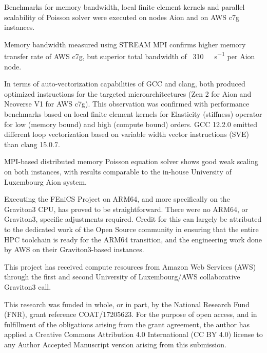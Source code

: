 Benchmarks for memory bandwidth, local finite element kernels and parallel
scalability of Poisson solver were executed on nodes Aion and on AWS c7g
instances.

Memory bandwidth measured using STREAM MPI confirms higher memory transfer rate
of AWS c7g, but superior total bandwidth of ~\SI{310}{\giga\byte\per\second}
per Aion node.

In terms of auto-vectorization capabilities of GCC and clang, both produced
optimized instructions for the targeted microarchitectures (Zen 2 for Aion and
Neoverse V1 for AWS c7g). This observation was confirmed with performance
benchmarks based on local finite element kernels for Elasticity (stiffness)
operator for low (memory bound) and high (compute bound) orders. GCC 12.2.0
emitted different loop vectorization based on variable width vector instructions
(SVE) than clang 15.0.7.

MPI-based distributed memory Poisson equation solver shows good weak scaling on
both instances, with results comparable to the in-house University of
Luxembourg Aion system.

Executing the FEniCS Project on ARM64, and more specifically on the Graviton3
CPU, has proved to be straightforward. There were no ARM64, or Graviton3,
specific adjustments required. Credit for this can largely be attributed to the
dedicated work of the Open Source community in ensuring that the entire HPC
toolchain is ready for the ARM64 transition, and the engineering work done by
AWS on their Graviton3-based instances.


\begin{acknowledgement}
This project has received compute resources from Amazon Web Services (AWS)
through the first and second University of Luxembourg/AWS collaborative
Graviton3 call.

This research was funded in whole, or in part, by the National Research Fund
(FNR), grant reference COAT/17205623. For the purpose of open access, and in
fulfillment of the obligations arising from the grant agreement, the author has
applied a Creative Commons Attribution 4.0 International (CC BY 4.0) license to
any Author Accepted Manuscript version arising from this submission.
\end{acknowledgement}





